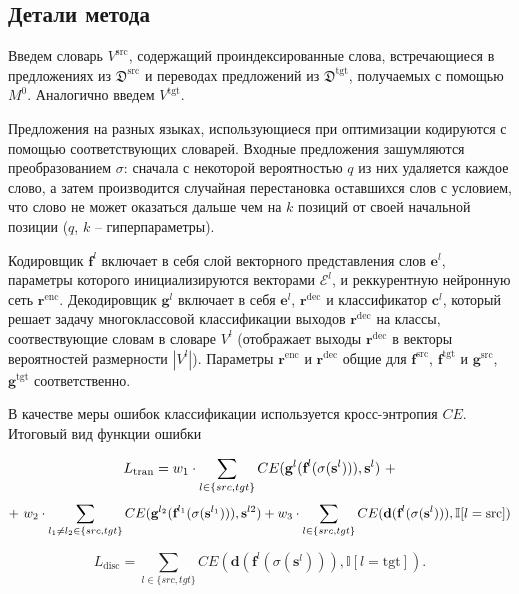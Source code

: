 \documentclass[12pt,twoside]{article}
\begin{document}
\subsection{Детали метода}   
Введем словарь $V^{\text{src}}$, содержащий проиндексированные слова, встречающиеся в предложениях из $\mathfrak{D}^{\text{src}}$ и переводах предложений из  $\mathfrak{D}^{\text{tgt}}$, получаемых с помощью $M^0$. Аналогично введем $V^{\text{tgt}}$. 

Предложения на разных языках, использующиеся при оптимизации кодируются с помощью соответствующих словарей. Входные предложения зашумляются преобразованием $\sigma$: сначала с некоторой вероятностью $q$ из них удаляется каждое слово, а затем производится случайная перестановка оставшихся слов с условием, что слово не может оказаться дальше чем на $k$ позиций от своей начальной позиции ($q$, $k$ -- гиперпараметры).

Кодировщик $\textbf{f}^{l}$ включает в себя слой векторного представления слов $\textbf{e}^{l}$, параметры которого инициализируются векторами $\mathcal{E}^{l}$, и реккурентную нейронную сеть $\textbf{r}^{\text{enc}}$. Декодировщик $\textbf{g}^{l}$ включает в себя $\textbf{e}^{l}$, $\textbf{r}^{\text{dec}}$ и классификатор $\textbf{c}^{l}$, который решает задачу многоклассовой классификации выходов $\textbf{r}^{\text{dec}}$ на классы, соотвествующие словам в словаре $V^{l}$ (отображает выходы $\textbf{r}^{\text{dec}}$ в векторы вероятностей размерности $|V^{l}|$). Параметры $\textbf{r}^{\text{enc}}$ и $\textbf{r}^{\text{dec}}$ общие для $\textbf{f}^{\text{src}}$, $\textbf{f}^{\text{tgt}}$ и $\textbf{g}^{\text{src}}$, $\textbf{g}^{\text{tgt}}$ соответственно.

В качестве меры ошибок классификации используется кросс-энтропия $CE$. Итоговый вид функции ошибки

$$
L_{\text{tran}} = w_1 \cdot \sum_{l \in \\ \{src, tgt\}} CE(\textbf{g}^{l}(\textbf{f}^{l}(\sigma(\mathbf{s}^{l}))), \mathbf{s}^{l})\ +
$$
$$
+\ w_2 \cdot \sum_{l_1 \ne l_2 \in \\ \{src, tgt\}} CE(\textbf{g}^{l_2}(\textbf{f}^{l_1}(\sigma(\mathbf{s}^{l_1}))), \mathbf{s}^{l2}) +
w_3 \cdot \sum_{l \in \\ \{src, tgt\}} CE(\textbf{d}(\textbf{f}^{l}(\sigma(\mathbf{s}^{l}))), \mathbb{I}[l = \text{src}])
$$

$$
L_{\text{disc}} = \sum_{l \in \{src, tgt\}} CE(\textbf{d}(\textbf{f}^{l}(\sigma(\mathbf{s}^{l}))), \mathbb{I}[l = \text{tgt}]).
$$
\end{document}
